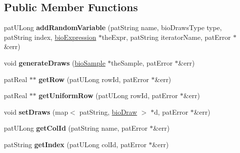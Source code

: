 \subsection*{Public Member Functions}
\begin{DoxyCompactItemize}
\item 
\mbox{\label{classbio_random_draws_ab53a3d9c4b75fad64a2457bd8233ffb7}} 
pat\+U\+Long {\bfseries add\+Random\+Variable} (pat\+String name, bio\+Draws\+Type type, pat\+String index, \hyperlink{classbio_expression}{bio\+Expression} $\ast$the\+Expr, pat\+String iterator\+Name, pat\+Error $\ast$\&err)
\item 
\mbox{\label{classbio_random_draws_a8779a4e2a29843c9cb7d1296b77c56f0}} 
void {\bfseries generate\+Draws} (\hyperlink{classbio_sample}{bio\+Sample} $\ast$the\+Sample, pat\+Error $\ast$\&err)
\item 
\mbox{\label{classbio_random_draws_a98943e5d900a67e640e81c592c8c3374}} 
pat\+Real $\ast$$\ast$ {\bfseries get\+Row} (pat\+U\+Long row\+Id, pat\+Error $\ast$\&err)
\item 
\mbox{\label{classbio_random_draws_a4f5643a4987d5b8728e48dabe7ed1485}} 
pat\+Real $\ast$$\ast$ {\bfseries get\+Uniform\+Row} (pat\+U\+Long row\+Id, pat\+Error $\ast$\&err)
\item 
\mbox{\label{classbio_random_draws_ad807d3c0dc22e6a119ad72f664bac694}} 
void {\bfseries set\+Draws} (map$<$ pat\+String, \hyperlink{structbio_random_draws_1_1bio_draw}{bio\+Draw} $>$ $\ast$d, pat\+Error $\ast$\&err)
\item 
\mbox{\label{classbio_random_draws_ae39024dfada27303533c3b9d11ded792}} 
pat\+U\+Long {\bfseries get\+Col\+Id} (pat\+String name, pat\+Error $\ast$\&err)
\item 
\mbox{\label{classbio_random_draws_a085914e70374def130a911a6f3c372cc}} 
pat\+String {\bfseries get\+Index} (pat\+U\+Long col\+Id, pat\+Error $\ast$\&err)
\item 
\mbox{\label{classbio_random_draws_a27fa7d6be38f900a6acafde8999f55c8}} 

\end{DoxyCompactItemize}
